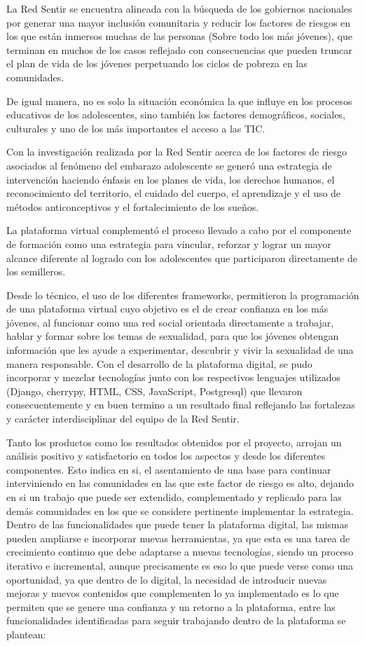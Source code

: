 \documentclass[journal,transmag]{IEEEtran}
\begin{document}
La Red Sentir se encuentra alineada con la búsqueda de los gobiernos nacionales por generar una mayor inclusión comunitaria y reducir los factores de riesgos en los que están inmersos muchas de las personas (Sobre todo los más jóvenes), que terminan en muchos de los casos reflejado con consecuencias que pueden truncar el plan de vida de los jóvenes perpetuando los ciclos de pobreza en las comunidades. 

De igual manera, no es solo la situación económica la que influye en los procesos educativos de los adolescentes, sino también  los factores demográficos, sociales, culturales y uno de los más importantes el acceso a las TIC.

Con la investigación realizada por la Red Sentir acerca de los factores de riesgo asociados al fenómeno del embarazo adolescente se generó una estrategia de intervención haciendo énfasis en los planes de vida, los derechos humanos, el reconocimiento del territorio, el cuidado del cuerpo, el aprendizaje y el uso de métodos anticonceptivos y el fortalecimiento de los sueños.

La plataforma virtual complementó el proceso llevado a cabo por el componente de formación como una estrategia para vincular, reforzar y lograr un mayor alcance diferente al logrado con los adolescentes que participaron directamente de los semilleros. 

Desde lo técnico, el uso de los diferentes frameworks, permitieron la programación de una plataforma virtual cuyo objetivo es el de crear confianza en los más jóvenes, al funcionar como una red social orientada directamente a trabajar, hablar y formar sobre los temas de sexualidad, para que los jóvenes obtengan información que les ayude a experimentar, descubrir y vivir la sexualidad de una manera responsable. Con el desarrollo de la plataforma digital, se pudo incorporar y mezclar tecnologías junto 
con los respectivos lenguajes utilizados (Django, cherrypy, HTML, CSS, JavaScript, Postgresql) que llevaron consecuentemente y en buen termino a un resultado final reflejando las fortalezas y carácter interdisciplinar del equipo de la Red Sentir.

Tanto los productos como los resultados obtenidos por el proyecto, arrojan un análisis positivo y satisfactorio en todos los aspectos y desde los diferentes componentes. Esto indica en si, el asentamiento de una base para continuar interviniendo en las comunidades en las que este factor de riesgo es alto, dejando en si un trabajo que puede ser extendido, complementado y replicado para las demás comunidades en los que se considere pertinente implementar la estrategia. Dentro de las funcionalidades que puede tener la plataforma digital, las mismas pueden ampliarse e incorporar nuevas herramientas, ya que esta es una tarea de crecimiento continuo que debe adaptarse a nuevas tecnologías, siendo un proceso iterativo e incremental, aunque precisamente es eso lo que puede verse como una oportunidad, ya que dentro de lo digital, la necesidad de introducir nuevas mejoras y nuevos contenidos que complementen lo ya implementado es lo que permiten que se genere una confianza y un retorno a la plataforma, entre las funcionalidades identificadas para seguir trabajando dentro de la plataforma se plantean:
\end{document}
